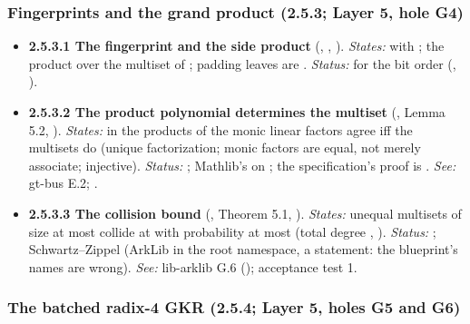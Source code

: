 \subsubsection{Fingerprints and the grand product (2.5.3; Layer 5, hole G4)}\label{sec:obl-gen-fingerprint}

\begin{itemize}[label={}, leftmargin=1.3em, itemindent=-1.3em, labelwidth=0pt, labelsep=0pt, itemsep=4pt, topsep=3pt]
\item {}\label{obl:node-2.5.3.1}\textbf{2.5.3.1 The fingerprint and the side product} (, , ). \emph{States:}  with ; the product over the multiset of ; padding leaves are . \emph{Status:}   for the bit order (, ).
\item {}\label{obl:node-2.5.3.2}\textbf{2.5.3.2 The product polynomial determines the multiset} (, Lemma 5.2, ). \emph{States:} in  the products of the monic linear factors  agree iff the multisets do (unique factorization; monic factors are equal, not merely associate;  injective). \emph{Status:} ; Mathlib's  on  ; the specification's proof is . \emph{See:} gt-bus E.2; .
\item {}\label{obl:node-2.5.3.3}\textbf{2.5.3.3 The collision bound} (, Theorem 5.1, ). \emph{States:} unequal multisets of size at most  collide at  with probability at most  (total degree , ). \emph{Status:} ; Schwartz–Zippel  (ArkLib  in the root namespace,  a  statement: the blueprint's names are wrong). \emph{See:} lib-arklib G.6 (); acceptance test 1.
\end{itemize}

\subsubsection{The batched radix-4 GKR (2.5.4; Layer 5, holes G5 and G6)}\label{sec:obl-gen-gkr}

